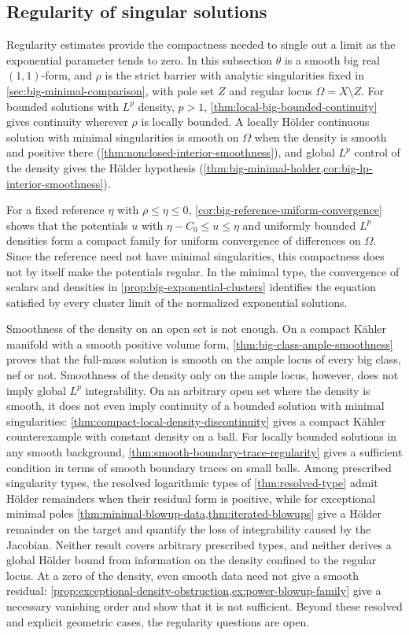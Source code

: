 \subsection{Regularity of singular solutions}

Regularity estimates provide the compactness needed to single out a limit as the exponential parameter tends to zero. In this subsection $\theta$ is a smooth big real $(1,1)$-form, and $\rho$ is the strict barrier with analytic singularities fixed in \cref{sec:big-minimal-comparison}, with pole set $Z$ and regular locus $\Omega=X\setminus Z$. For bounded solutions with $L^p$ density, $p>1$, \cref{thm:local-big-bounded-continuity} gives continuity wherever $\rho$ is locally bounded. A locally H\"older continuous solution with minimal singularities is smooth on $\Omega$ when the density is smooth and positive there (\cref{thm:nonclosed-interior-smoothness}), and global $L^p$ control of the density gives the H\"older hypothesis (\cref{thm:big-minimal-holder,cor:big-lp-interior-smoothness}).

For a fixed reference $\eta$ with $\rho\leq\eta\leq0$, \cref{cor:big-reference-uniform-convergence} shows that the potentials $u$ with $\eta-C_0\leq u\leq\eta$ and uniformly bounded $L^p$ densities form a compact family for uniform convergence of differences on $\Omega$. Since the reference need not have minimal singularities, this compactness does not by itself make the potentials regular. In the minimal type, the convergence of scalars and densities in \cref{prop:big-exponential-clusters} identifies the equation satisfied by every cluster limit of the normalized exponential solutions.

Smoothness of the density on an open set is not enough. On a compact K\"ahler manifold with a smooth positive volume form, \cref{thm:big-class-ample-smoothness} proves that the full-mass solution is smooth on the ample locus of every big class, nef or not. Smoothness of the density only on the ample locus, however, does not imply global $L^p$ integrability. On an arbitrary open set where the density is smooth, it does not even imply continuity of a bounded solution with minimal singularities: \cref{thm:compact-local-density-discontinuity} gives a compact K\"ahler counterexample with constant density on a ball. For locally bounded solutions in any smooth background, \cref{thm:smooth-boundary-trace-regularity} gives a sufficient condition in terms of smooth boundary traces on small balls. Among prescribed singularity types, the resolved logarithmic types of \cref{thm:resolved-type} admit H\"older remainders when their residual form is positive, while for exceptional minimal poles \cref{thm:minimal-blowup-data,thm:iterated-blowups} give a H\"older remainder on the target and quantify the loss of integrability caused by the Jacobian. Neither result covers arbitrary prescribed types, and neither derives a global H\"older bound from information on the density confined to the regular locus. At a zero of the density, even smooth data need not give a smooth residual: \cref{prop:exceptional-density-obstruction,ex:power-blowup-family} give a necessary vanishing order and show that it is not sufficient. Beyond these resolved and explicit geometric cases, the regularity questions are open.

